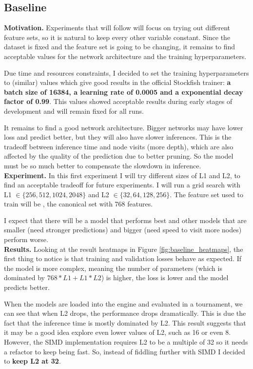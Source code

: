 \subsection{Baseline}

\textbf{Motivation.} Experiments that will follow will focus on trying out different feature sets, so it is natural to keep every other variable constant. Since the dataset is fixed and the feature set is going to be changing, it remains to find acceptable values for the network architecture and the training hyperparameters. 

Due time and resources constraints, I decided to set the training hyperparameters to   (similar) values which give good results in the official Stockfish trainer: \textbf{a batch size of 16384, a learning rate of 0.0005 and a exponential decay factor of 0.99}. This values showed acceptable results during early stages of development and will remain fixed for all runs.

It remains to find a good network architecture. Bigger networks may have lower loss and predict better, but they will also have slower inferences. This is the tradeoff between inference time and node visits (more depth), which are also affected by the quality of the prediction due to better pruning. So the model must be so much better to compensate the slowdown in inference. \\

\textbf{Experiment.}  In this first experiment I will try different sizes of L1 and L2,  to find an acceptable tradeoff for future experiments. I will run a grid search with L1 $\in \{256, 512, 1024, 2048\}$ and L2 $\in \{32, 64, 128, 256\}$. The feature set used to train will be , the canonical set with 768 features.

I expect that there will be a model that performs best and other models that are smaller (need stronger predictions) and bigger (need speed to visit more nodes) perform worse. \\

\textbf{Results.} Looking at the result heatmaps in Figure \ref{fig:baseline_heatmaps}, the first thing to notice is that training and validation losses behave as expected. If the model is more complex, meaning the number of parameters (which is dominated by $768*L1+L1*L2$) is higher, the loss is lower and the model predicts better.

When the models are loaded into the engine and evaluated in a tournament, we can see that when L2 drops, the performance drops dramatically. This is due the fact that the inference time is mostly dominated by L2. This result suggests that it may be a good idea explore even lower values of L2, such as 16 or even 8. However, the SIMD implementation requires L2 to be a multiple of 32 so it needs a refactor to keep being fast. So, instead of fiddling further with SIMD I decided to \textbf{keep L2 at 32}.

